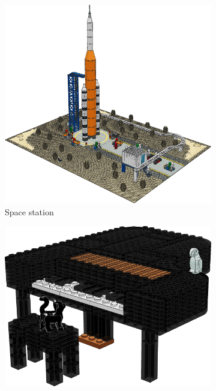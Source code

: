 \documentclass{PDS}
\begin{document}
\begin{figure}[htbp]
    \centering
    \begin{subfigure}[b]{0.21\textwidth}
        \includegraphics[width=\textwidth]{./figures/space.png}
        \caption{Space station}
        \label{fig:rocket}
    \end{subfigure}
    \hspace{0.05\textwidth}
    \begin{subfigure}[b]{0.21\textwidth}
        \includegraphics[width=\textwidth]{./figures/piano.png}

\end{subfigure}
\end{figure}
\end{document}
